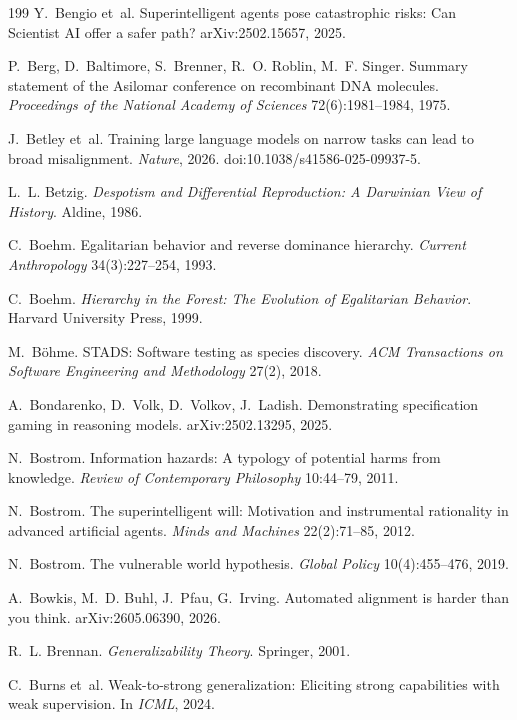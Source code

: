\documentclass[10pt,twocolumn,letterpaper]{article}
\theoremstyle{definition}
\begin{document}
\begin{thebibliography}{199}
 Y.~Bengio et~al. Superintelligent agents pose catastrophic risks: Can Scientist AI offer a safer path? arXiv:2502.15657, 2025.

 P.~Berg, D.~Baltimore, S.~Brenner, R.~O. Roblin, M.~F. Singer. Summary statement of the Asilomar conference on recombinant DNA molecules. \emph{Proceedings of the National Academy of Sciences} 72(6):1981--1984, 1975.

 J.~Betley et~al. Training large language models on narrow tasks can lead to broad misalignment. \emph{Nature}, 2026. doi:10.1038/s41586-025-09937-5.

 L.~L. Betzig. \emph{Despotism and Differential Reproduction: A Darwinian View of History}. Aldine, 1986.

 C.~Boehm. Egalitarian behavior and reverse dominance hierarchy. \emph{Current Anthropology} 34(3):227--254, 1993.

 C.~Boehm. \emph{Hierarchy in the Forest: The Evolution of Egalitarian Behavior}. Harvard University Press, 1999.

 M.~B\"ohme. STADS: Software testing as species discovery. \emph{ACM Transactions on Software Engineering and Methodology} 27(2), 2018.

 A.~Bondarenko, D.~Volk, D.~Volkov, J.~Ladish. Demonstrating specification gaming in reasoning models. arXiv:2502.13295, 2025.

 N.~Bostrom. Information hazards: A typology of potential harms from knowledge. \emph{Review of Contemporary Philosophy} 10:44--79, 2011.

 N.~Bostrom. The superintelligent will: Motivation and instrumental rationality in advanced artificial agents. \emph{Minds and Machines} 22(2):71--85, 2012.

 N.~Bostrom. The vulnerable world hypothesis. \emph{Global Policy} 10(4):455--476, 2019.

 A.~Bowkis, M.~D. Buhl, J.~Pfau, G.~Irving. Automated alignment is harder than you think. arXiv:2605.06390, 2026.

 R.~L. Brennan. \emph{Generalizability Theory}. Springer, 2001.

 C.~Burns et~al. Weak-to-strong generalization: Eliciting strong capabilities with weak supervision. In \emph{ICML}, 2024.


\end{thebibliography}
\end{document}
